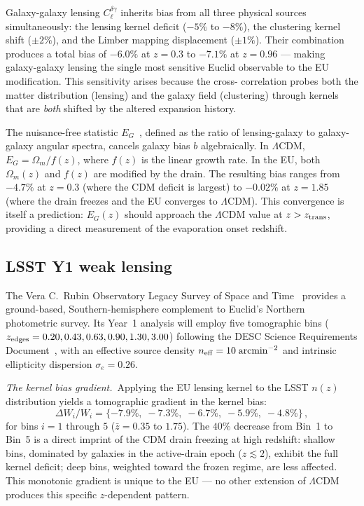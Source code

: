 \documentclass[a4paper,fleqn]{cas-dc}
\begin{document}
Galaxy-galaxy lensing $C_\ell^{\delta\gamma}$ inherits
bias from all three physical sources simultaneously:
the lensing kernel deficit ($-5\%$ to $-8\%$), the
clustering kernel shift ($\pm\!2\%$), and the Limber
mapping displacement ($\pm\!1\%$). Their combination
produces a total bias of $-6.0\%$ at $z = 0.3$ to
$-7.1\%$ at $z = 0.96$ --- making galaxy-galaxy lensing
the single most sensitive Euclid observable to the EU
modification. This sensitivity arises because the cross-
correlation probes both the matter distribution (lensing)
and the galaxy field (clustering) through kernels that
are \textit{both} shifted by the altered expansion
history.

The nuisance-free statistic $E_G$~\cite{zhang2007},
defined as the ratio of lensing-galaxy to galaxy-galaxy
angular spectra, cancels galaxy bias $b$ algebraically.
In $\Lambda$CDM, $E_G = \Omega_m/f(z)$, where $f(z)$ is
the linear growth rate. In the EU, both $\Omega_m(z)$ and
$f(z)$ are modified by the drain. The resulting bias
ranges from $-4.7\%$ at $z = 0.3$ (where the CDM deficit
is largest) to $-0.02\%$ at $z = 1.85$ (where the drain
freezes and the EU converges to $\Lambda$CDM). This
convergence is itself a prediction: $E_G(z)$ should
approach the $\Lambda$CDM value at $z > z_{\rm trans}$,
providing a direct measurement of the evaporation onset
redshift.

\subsection{LSST Y1 weak lensing}
\label{sec:lsst}

The Vera C.~Rubin Observatory Legacy Survey of Space
and Time~\cite{lsst_srd2018} provides a ground-based,
Southern-hemisphere complement to Euclid's Northern
photometric survey. Its Year~1 analysis will employ
five tomographic bins ($z_{\rm edges} = 0.20, 0.43,
0.63, 0.90, 1.30, 3.00$) following the DESC Science
Requirements Document~\cite{mandelbaum2018}, with an
effective source density $n_{\rm eff} = 10\;\mathrm{arcmin}^{-2}$
and intrinsic ellipticity dispersion $\sigma_e = 0.26$.

\textit{The kernel bias gradient.}~Applying the EU lensing
kernel to the LSST $n(z)$ distribution yields a
tomographic gradient in the kernel bias:
\begin{equation}
\Delta W_i/W_i = \{-7.9\%,\; -7.3\%,\; -6.7\%,\; -5.9\%,\; -4.8\%\}\,,
\label{eq:lsst_gradient}
\end{equation}
for bins $i = 1$ through $5$ ($\bar{z} = 0.35$ to $1.75$).
The $40\%$ decrease from Bin~1 to Bin~5 is a direct
imprint of the CDM drain freezing at high redshift:
shallow bins, dominated by galaxies in the active-drain
epoch ($z \lesssim 2$), exhibit the full kernel deficit;
deep bins, weighted toward the frozen regime, are less
affected. This monotonic gradient is unique to the EU
--- no other extension of $\Lambda$CDM produces this
specific $z$-dependent pattern.
\end{document}
